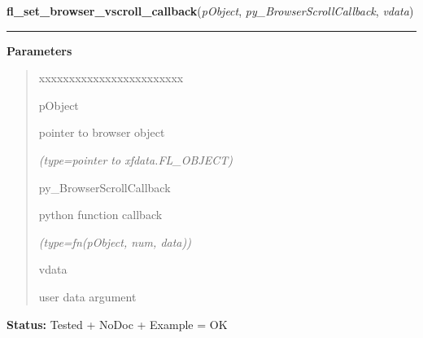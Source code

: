 \hspace{.8\funcindent}\begin{boxedminipage}{\funcwidth}

    \raggedright \textbf{fl\_set\_browser\_vscroll\_callback}(\textit{pObject}, \textit{py\_BrowserScrollCallback}, \textit{vdata})

    \vspace{-1.5ex}

    \rule{\textwidth}{0.5\fboxrule}
\setlength{\parskip}{2ex}
\setlength{\parskip}{1ex}
      \textbf{Parameters}
      \vspace{-1ex}

      \begin{quote}
        \begin{Ventry}{xxxxxxxxxxxxxxxxxxxxxxxx}

          \item[pObject]

          pointer to browser object

            {\it (type=pointer to xfdata.FL\_OBJECT)}

          \item[py\_BrowserScrollCallback]

          python function callback

            {\it (type=fn(pObject, num, data))}

          \item[vdata]

          user data argument

        \end{Ventry}

      \end{quote}

\textbf{Status:} Tested + NoDoc + Example = OK



    \end{boxedminipage}

    \label{xformslib:library:fl_get_browser_line_yoffset}

    \vspace{0.5ex}

